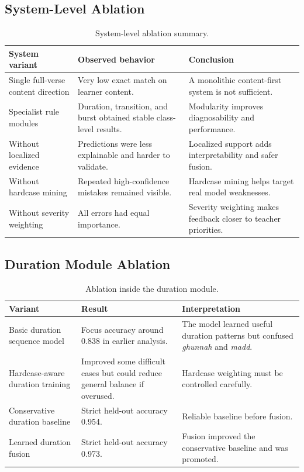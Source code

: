 \documentclass[12pt,a4paper]{report}
\begin{document}
\subsection{System-Level Ablation}

\begin{table}[H]
\centering
\small
\begin{tabularx}{\textwidth}{p{} p{} X}
\toprule
\textbf{System variant} & \textbf{Observed behavior} & \textbf{Conclusion} \\
\midrule
Single full-verse content direction &
Very low exact match on learner content. &
A monolithic content-first system is not sufficient. \\
\midrule
Specialist rule modules &
Duration, transition, and burst obtained stable class-level results. &
Modularity improves diagnosability and performance. \\
\midrule
Without localized evidence &
Predictions were less explainable and harder to validate. &
Localized support adds interpretability and safer fusion. \\
\midrule
Without hardcase mining &
Repeated high-confidence mistakes remained visible. &
Hardcase mining helps target real model weaknesses. \\
\midrule
Without severity weighting &
All errors had equal importance. &
Severity weighting makes feedback closer to teacher priorities. \\
\bottomrule
\end{tabularx}
\caption{System-level ablation summary.}
\label{tab:system_ablation}
\end{table}

\subsection{Duration Module Ablation}

\begin{table}[H]
\centering
\small
\begin{tabularx}{\textwidth}{p{} p{} X}
\toprule
\textbf{Variant} & \textbf{Result} & \textbf{Interpretation} \\
\midrule
Basic duration sequence model &
Focus accuracy around 0.838 in earlier analysis. &
The model learned useful duration patterns but confused \textit{ghunnah} and
\textit{madd}. \\
\midrule
Hardcase-aware duration training &
Improved some difficult cases but could reduce general balance if overused. &
Hardcase weighting must be controlled carefully. \\
\midrule
Conservative duration baseline &
Strict held-out accuracy 0.954. &
Reliable baseline before fusion. \\
\midrule
Learned duration fusion &
Strict held-out accuracy 0.973. &
Fusion improved the conservative baseline and was promoted. \\
\bottomrule
\end{tabularx}
\caption{Ablation inside the duration module.}
\label{tab:duration_ablation}
\end{table}
\end{document}
